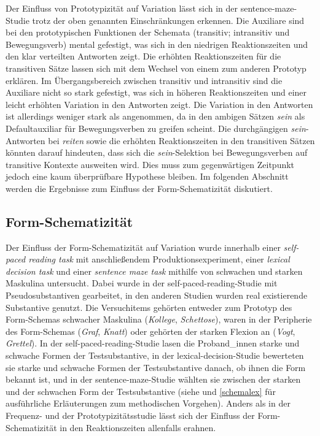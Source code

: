 Der Einfluss von Prototypizität auf Variation lässt sich in der sentence-maze-Studie trotz der oben genannten Einschränkungen erkennen. Die Auxiliare sind bei den prototypischen Funktionen der Schemata (transitiv; intransitiv und Bewegungsverb) mental gefestigt, was sich in den niedrigen Reaktionszeiten und den klar verteilten Antworten zeigt. Die erhöhten Reaktionszeiten für die transitiven Sätze lassen sich mit dem Wechsel von einem zum anderen Prototyp erklären. Im Übergangsbereich zwischen transitiv und intransitiv sind die Auxiliare nicht so stark gefestigt, was sich in höheren Reaktionszeiten und einer leicht erhöhten Variation in den Antworten zeigt. Die Variation in den Antworten ist allerdings weniger stark als angenommen, da in den ambigen Sätzen \textit{sein} als Defaultauxiliar für Bewegungsverben zu greifen scheint. Die durchgängigen \textit{sein}-Antworten bei \textit{reiten} sowie die erhöhten Rea\-ktionszeiten in den transitiven Sätzen könnten darauf hindeuten, dass sich die \textit{sein}-Selektion bei Bewegungsverben auf transitive Kontexte ausweiten wird. Dies muss zum gegenwärtigen Zeitpunkt jedoch eine kaum überprüfbare Hypothese bleiben. Im folgenden Abschnitt werden die Ergebnisse zum Einfluss der Form-Schematizität diskutiert.  

\subsection{Form-Schematizität}

Der Einfluss der Form-Schematizität auf Variation wurde innerhalb einer \textit{self-paced reading task} mit anschließendem Produktionsexperiment, einer \textit{lexical decision task} und einer \textit{sentence maze task} mithilfe von schwachen und starken Maskulina untersucht. Dabei wurde in der self-paced-reading-Studie mit Pseudosubstantiven gearbeitet, in den anderen Studien wurden real existierende Substantive genutzt. Die Versuchitems gehörten entweder zum Prototyp des Form-Schemas schwacher Maskulina (\textit{Kollege}, \textit{Schettose}), waren in der Peripherie des Form-Schemas (\textit{Graf}, \textit{Knatt}) oder gehörten der starken Flexion an (\textit{Vogt}, \textit{Grettel}). In der self-paced-reading-Studie lasen die Proband\_innen starke und schwache Formen der Testsubstantive, in der lexical-decision-Studie bewerteten sie starke und schwache Formen der Testsubstantive danach, ob ihnen die Form bekannt ist, und in der sentence-maze-Studie wählten sie zwischen der starken und der schwachen Form der Testsubstantive (siehe  und \ref{schemalex} für ausführliche Erläuterungen zum methodischen Vorgehen). Anders als in der Frequenz- und der Prototypizitätsstudie lässt sich der Einfluss der Form-Schematizität in den Reaktionszeiten allenfalls erahnen. 

